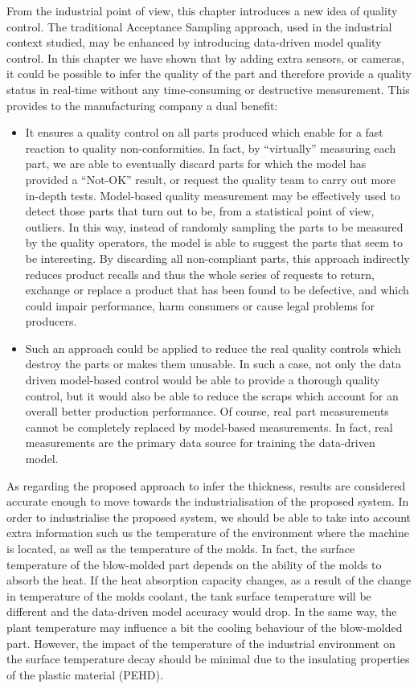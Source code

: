 From the industrial point of view, this chapter introduces a new idea of quality control. The traditional Acceptance Sampling approach, used in the industrial context studied, may be enhanced by introducing data-driven model quality control. In this chapter we have shown that by adding extra sensors, or cameras, it could be possible to infer the quality of the part and therefore provide a quality status in real-time without any time-consuming or destructive measurement. This provides to the manufacturing company a dual benefit:
%
\begin{itemize}
    \item It ensures a quality control on all parts produced which enable for a fast reaction to quality non-conformities. In fact, by ``virtually'' measuring each part, we are able to eventually discard parts for which the model has provided a ``Not-OK'' result, or request the quality team to carry out more in-depth tests. Model-based quality measurement may be effectively used to detect those parts that turn out to be, from a statistical point of view, outliers. In this way, instead of randomly sampling the parts to be measured by the quality operators, the model is able to suggest the parts that seem to be interesting. By discarding all non-compliant parts, this approach indirectly reduces product recalls and thus the whole series of requests to return, exchange or replace a product that has been found to be defective, and which could impair performance, harm consumers or cause legal problems for producers.
    \item Such an approach could be applied to reduce the real quality controls which destroy the parts or makes them unusable. In such a case, not only the data driven model-based control would be able to provide a thorough quality control, but it would also be able to reduce the scraps which account for an overall better production performance. Of course, real part measurements cannot be completely replaced by model-based measurements. In fact, real measurements are the primary data source for training the data-driven model. 
\end{itemize}
%
As regarding the proposed approach to infer the thickness, results are considered accurate enough to move towards the industrialisation of the proposed system. In order to industrialise the proposed system, we should be able to take into account extra information such us the temperature of the environment where the machine is located, as well as the temperature of the molds. In fact, the surface temperature of the blow-molded part depends on the ability of the molds to absorb the heat. If the heat absorption capacity changes, as a result of the change in temperature of the molds coolant, the tank surface temperature will be different and the data-driven model accuracy would drop. In the same way, the plant temperature may influence a bit the cooling behaviour of the blow-molded part. However, the impact of the temperature of the industrial environment on the surface temperature decay should be minimal due to the insulating properties of the plastic material (PEHD).  




